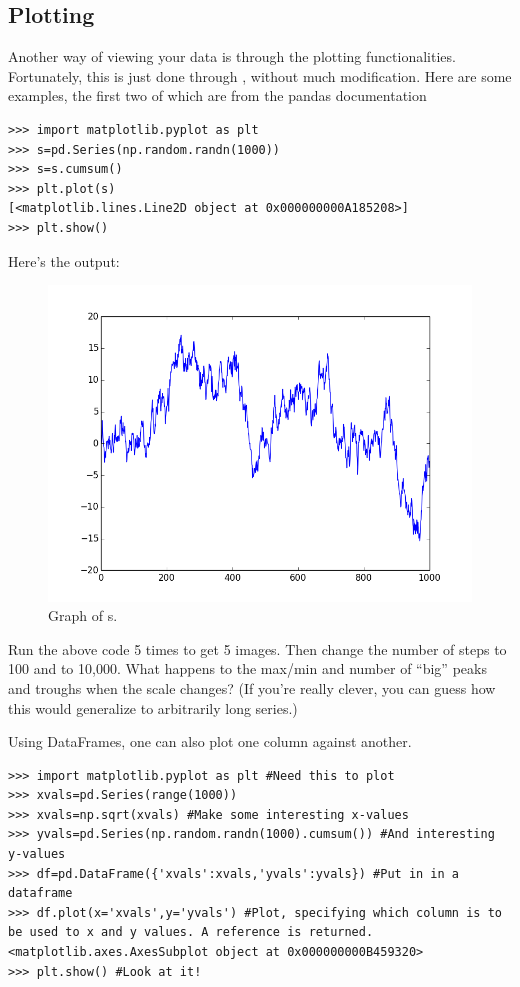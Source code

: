\subsection*{Plotting}

Another way of viewing your data is through the plotting functionalities. Fortunately, this is just done through , without much modification. Here are some examples, the first two of which are from the pandas documentation

\begin{lstlisting}
>>> import matplotlib.pyplot as plt
>>> s=pd.Series(np.random.randn(1000))
>>> s=s.cumsum()
>>> plt.plot(s)
[<matplotlib.lines.Line2D object at 0x000000000A185208>]
>>> plt.show()
\end{lstlisting}

Here's the output:

\begin{figure}
\centering
\includegraphics[width=.5 \textwidth]{cumsumplot.png}
\caption{ Graph of s.
}
\label{pandas:cumsumplot}
\end{figure}

\begin{problem}
Run the above code 5 times to get 5 images. Then change the number of steps to 100 and to 10,000. What happens to the max/min and number of ``big'' peaks and troughs when the scale changes? (If you're really clever, you can guess how this would generalize to arbitrarily long series.)
\end{problem}

Using DataFrames, one can also plot one column against another.

\begin{lstlisting}
>>> import matplotlib.pyplot as plt #Need this to plot
>>> xvals=pd.Series(range(1000))
>>> xvals=np.sqrt(xvals) #Make some interesting x-values
>>> yvals=pd.Series(np.random.randn(1000).cumsum()) #And interesting y-values
>>> df=pd.DataFrame({'xvals':xvals,'yvals':yvals}) #Put in in a dataframe
>>> df.plot(x='xvals',y='yvals') #Plot, specifying which column is to be used to x and y values. A reference is returned.
<matplotlib.axes.AxesSubplot object at 0x000000000B459320>
>>> plt.show() #Look at it!
\end{lstlisting}

